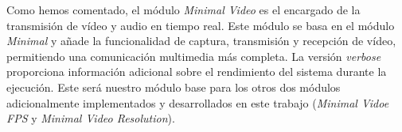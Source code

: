 \vspace{\baselineskip}
Como hemos comentado, el módulo \textit{Minimal Video} es el encargado de la transmisión de vídeo y audio en tiempo real. Este módulo se basa en el módulo \textit{Minimal} y añade la funcionalidad de captura, transmisión y recepción de vídeo, permitiendo una comunicación multimedia más completa. La versión \textit{verbose} proporciona información adicional sobre el rendimiento del sistema durante la ejecución. Este será nuestro módulo base para los otros dos módulos adicionalmente implementados y desarrollados en este trabajo (\textit{Minimal Vidoe FPS} y \textit{Minimal Video Resolution}).